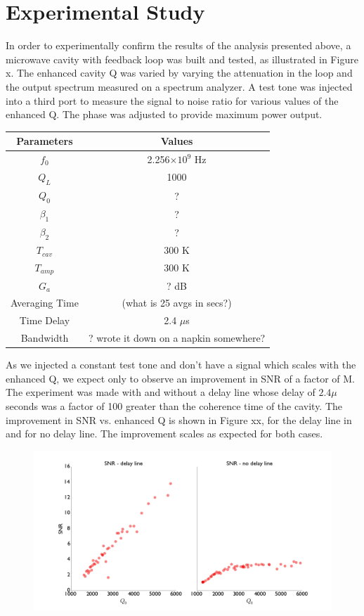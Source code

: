 \documentclass[aps,prl,twocolumn,groupedaddress]{revtex4-1}
\begin{document}
\section{Experimental Study}
In order to experimentally confirm the results of the analysis presented above, a microwave cavity with feedback loop was built and tested, as illustrated in Figure x. The enhanced cavity Q was varied by varying the attenuation in the loop and the output spectrum measured on a spectrum analyzer. A test tone was injected into a third port to measure the signal to noise ratio for various values of the enhanced Q. The phase was adjusted to provide maximum power output.

\begin{tabular}{|c|c|}
\hline
Parameters & Values \\ \hline
$f_0$ & 2.256$\times 10^9$ Hz \\
$Q_L$ & 1000 \\
$Q_0$ & ? \\
$\beta_1$ & ? \\
$\beta_2$ & ? \\
$T_{cav}$ & 300 K \\
$T_{amp}$ & 300 K \\
$G_a$ & ? dB \\
Averaging Time & (what is 25 avgs in secs?) \\
Time Delay & 2.4 $\mu$s \\
Bandwidth & ? wrote it down on a napkin somewhere? \\
\hline
\end{tabular}

As we injected a constant test tone and don't have a signal which scales with the enhanced Q, we expect only to observe an improvement in SNR of a factor of M.
The experiment was made with and without a delay line whose delay of $2.4\mu$seconds was a factor of 100 greater than the coherence time of the cavity. The improvement in SNR vs. enhanced Q is shown in Figure xx, for the delay line in and for no delay line. The improvement scales as expected for both cases.
\begin{figure}[htbp]
\centering
\includegraphics[width=\textwidth]{figs/summary_plots}
\caption{}
\label{fig:summary_plots}
\end{figure}
\end{document}
